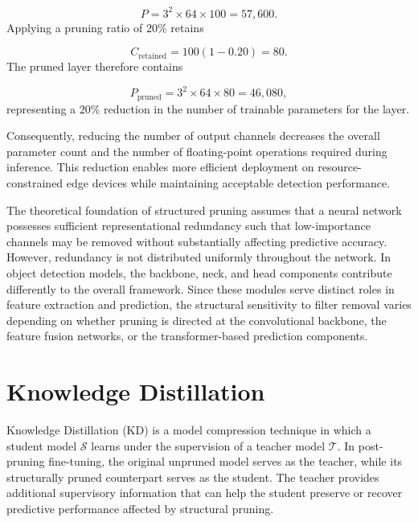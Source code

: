 \begin{equation}
P = 3^{2} \times 64 \times 100 = 57,\!600.
\end{equation}
Applying a pruning ratio of $20\%$ retains

\begin{equation}
C_{\mathrm{retained}} = 100(1-0.20)=80.
\end{equation}
The pruned layer therefore contains

\begin{equation}
P_{\mathrm{pruned}} = 3^{2} \times 64 \times 80 = 46,\!080,
\end{equation}
representing a $20\%$ reduction in the number of trainable parameters for the layer.

Consequently, reducing the number of output channels decreases the overall parameter count and the number of floating-point operations required during inference. This reduction enables more efficient deployment on resource-constrained edge devices while maintaining acceptable detection performance.

The theoretical foundation of structured pruning assumes that a neural network possesses sufficient representational redundancy such that low-importance channels may be removed without substantially affecting predictive accuracy. However, redundancy is not distributed uniformly throughout the network. In object detection models, the backbone, neck, and head components contribute differently to the overall framework. Since these modules serve distinct roles in feature extraction and prediction, the structural sensitivity to filter removal varies depending on whether pruning is directed at the convolutional backbone, the feature fusion networks, or the transformer-based prediction components.

\section{Knowledge Distillation}
\label{sec:kd}

Knowledge Distillation (KD) is a model compression technique in which a student model $\mathcal{S}$ learns under the supervision of a teacher model $\mathcal{T}$. In post-pruning fine-tuning, the original unpruned model serves as the teacher, while its structurally pruned counterpart serves as the student. The teacher provides additional supervisory information that can help the student preserve or recover predictive performance affected by structural pruning.


